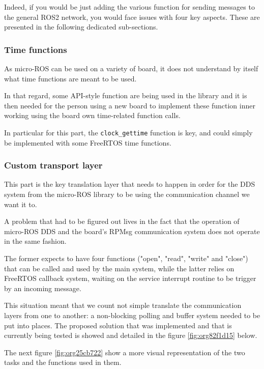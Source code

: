 \documentclass[10pt]{article}
\begin{document}
Indeed, if you would be just adding the various function for sending messages to
the general ROS2 network, you would face issues with four key aspects.
These are presented in the following dedicated sub-sections.

\subsubsection{Time functions}
\label{sec:orgef01188}
As micro-ROS can be used on a variety of board, it does not understand by itself
what time functions are meant to be used.

In that regard, some API-style function are being
used in the library and it is then needed for the person using a new board
to implement these function inner working using the board own time-related
function calls.

In particular for this part, the \texttt{clock\_gettime} function is key, and could
simply be implemented with some FreeRTOS time functions.

\subsubsection{Custom transport layer}
\label{sec:orgbc2bf1c}
This part is the key translation layer that needs to happen in order for the
DDS system from the micro-ROS library to be using the communication channel we
want it to.

A problem that had to be figured out lives in the fact that the operation of micro-ROS DDS
and the board's RPMsg communication system does not operate in the same fashion.

The former expects to have four functions ("open", "read", "write" and "close") that can
be called and used by the main system, while the latter relies on FreeRTOS callback
system, waiting on the service interrupt routine to be trigger by an incoming message.

This situation meant that we count not simple translate the communication layers from one
to another: a non-blocking polling and buffer system needed to be put into places.
The proposed solution that was implemented and that is currently being tested
is showed and detailed in the figure \ref{fig:org82f1d15} below.

The next figure \ref{fig:org25cb722} show a more visual representation of the two tasks and the
functions used in them.
\end{document}
